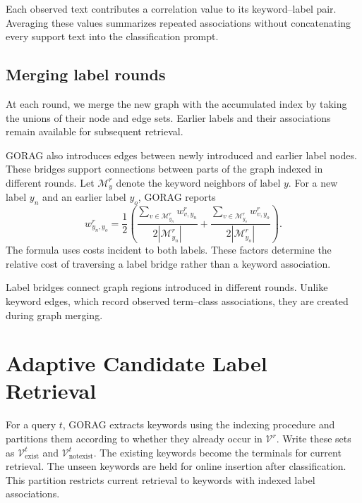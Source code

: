 Each observed text contributes a correlation value to its keyword--label pair. Averaging these values summarizes repeated associations without concatenating every support text into the classification prompt.

\subsection{Merging label rounds}
\label{sec:gorag:merge}

At each round, we merge the new graph with the accumulated index by taking the unions of their node and edge sets. Earlier labels and their associations remain available for subsequent retrieval.

GORAG also introduces edges between newly introduced and earlier label nodes. These bridges support connections between parts of the graph indexed in different rounds. Let $\mathcal{M}_y^r$ denote the keyword neighbors of label $y$. For a new label $y_n$ and an earlier label $y_o$, GORAG reports
\begin{equation}
w_{y_n,y_o}^r=\frac{1}{2}\left(
\frac{\sum_{v\in\mathcal{M}_{y_n}^r}w_{v,y_n}^r}{2|\mathcal{M}_{y_n}^r|}
+\frac{\sum_{v\in\mathcal{M}_{y_o}^r}w_{v,y_o}^r}{2|\mathcal{M}_{y_o}^r|}
\right).
\label{eq:gorag:labelbridge}
\end{equation}
The formula uses costs incident to both labels. These factors determine the relative cost of traversing a label bridge rather than a keyword association.

Label bridges connect graph regions introduced in different rounds. Unlike keyword edges, which record observed term--class associations, they are created during graph merging.

\section{Adaptive Candidate Label Retrieval}
\label{sec:gorag:retrieval}

For a query $t$, GORAG extracts keywords using the indexing procedure and partitions them according to whether they already occur in $\mathcal{V}^r$. Write these sets as $\mathcal{V}_{\mathrm{exist}}^t$ and $\mathcal{V}_{\mathrm{notexist}}^t$. The existing keywords become the terminals for current retrieval. The unseen keywords are held for online insertion after classification. This partition restricts current retrieval to keywords with indexed label associations.

